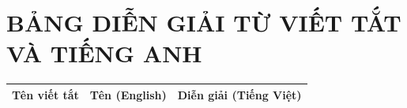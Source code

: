 
\chapter*{BẢNG DIỄN GIẢI TỪ VIẾT TẮT VÀ TIẾNG ANH}

\begin{longtable}{@{}p{3.0cm} >{\raggedright\arraybackslash}p{6cm} >{\raggedright\arraybackslash}p{5.5cm}@{}}

\textbf{Tên viết tắt} & \textbf{Tên (English)} & \textbf{Diễn giải (Tiếng Việt)} \\
\midrule
\endfirsthead


\end{longtable}
